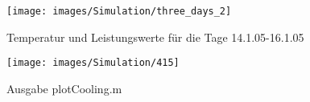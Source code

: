\begin{figure}[h]
\begin{center}
\texttt{[image: images/Simulation/three\_days\_2]}
\end{center}
\vspace{-25pt}
\caption{Temperatur und Leistungswerte f\"ur die Tage 14.1.05-16.1.05}
\label{fig:threet}
\end{figure}


\begin{figure}[h]
	\begin{center}
	\texttt{[image: images/Simulation/415]}
	\end{center}
\caption{Ausgabe plotCooling.m}
\label{fig:ausgabe}
\end{figure}


